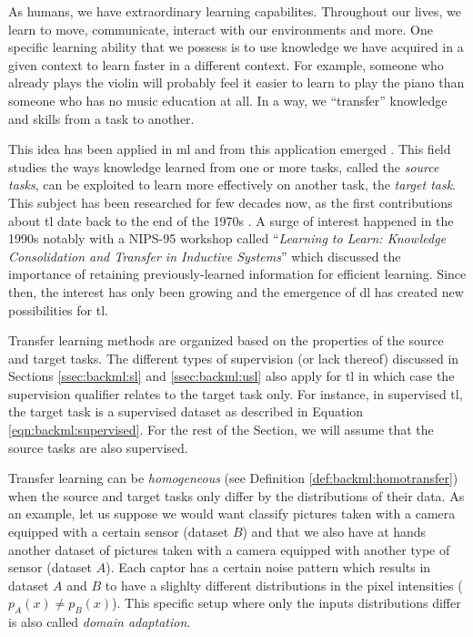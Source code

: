 As humans, we have extraordinary learning capabilites. Throughout our lives, we learn to move, communicate, interact with our environments and more. One specific learning ability that we possess is to use knowledge we have acquired in a given context to learn faster in a different context. For example, someone who already plays the violin will probably feel it easier to learn to play the piano than someone who has no music education at all. In a way, we ``transfer'' knowledge and skills from a task to another. 

This idea has been applied in \acrlong{ml} and from this application emerged  \parencite{yang2020transfer}. This field studies the ways knowledge learned from one or more tasks, called the \textit{source tasks}, can be exploited to learn more effectively on another task, the \textit{target task}. This subject has been researched for few decades now, as the first contributions about \acrlong{tl} date back to the end of the 1970s \parencite{bozinovski2020reminder}. A surge of interest happened in the 1990s notably with a NIPS-95 workshop called ``\textit{Learning to Learn: Knowledge Consolidation and Transfer in Inductive Systems}'' which discussed the importance of retaining previously-learned information for efficient learning. Since then, the interest has only been growing and the emergence of \acrlong{dl} has created new possibilities for \acrlong{tl}. 

Transfer learning methods are organized based on the properties of the source and target tasks. The different types of supervision (or lack thereof) discussed in Sections \ref{ssec:backml:sl} and \ref{ssec:backml:usl} also apply for \acrlong{tl} in which case the supervision qualifier relates to the target task only. For instance, in supervised \acrlong{tl}, the target task is a supervised dataset as described in Equation \ref{eqn:backml:supervised}. For the rest of the Section, we will assume that the source tasks are also supervised. 

Transfer learning can be \textit{homogeneous} (see Definition \ref{def:backml:homotransfer}) when the source and target tasks only differ by the distributions of their data. As an example, let us suppose we would want classify pictures taken with a camera equipped with a certain sensor (dataset $B$) and that we also have at hands another dataset of pictures taken with a camera equipped with another type of sensor (dataset $A$). Each captor has a certain noise pattern which results in dataset $A$ and $B$ to have a slighlty different distributions in the pixel intensities (\ie $p_A(x) \neq p_B(x)$). This specific setup where only the inputs distributions differ is also called \textit{domain adaptation}.  

